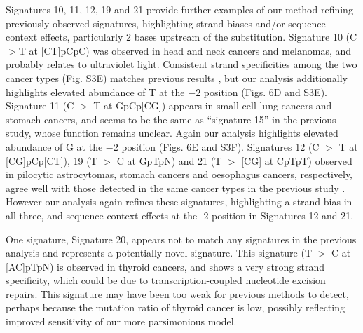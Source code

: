 \documentclass[10pt,letterpaper]{article}
\begin{document}
Signatures 10, 11, 12, 19 and 21 provide further examples
of our method refining previously observed signatures, highlighting strand biases and/or sequence context effects,
particularly 2 bases upstream of the substitution.
Signature 10 (C $>$T at [CT]pCpC) was observed in head and neck cancers and melanomas, and probably relates to ultraviolet light.
Consistent strand specificities among the two cancer types (Fig. S3E) matches previous results \cite{pmid23318258}, 
but our analysis additionally highlights elevated abundance of T at the $-2$ position (Figs. 6D and S3E). 
Signature 11 (C $>$ T at GpCp[CG]) appears in small-cell lung cancers and stomach cancers,
and seems to be the same as ``signature 15'' in the previous study, whose function remains unclear. Again our analysis highlights elevated abundance of G at the $-2$ position (Figs. 6E and S3F).
Signatures 12 (C $>$ T at [CG]pCp[CT]), 19 (T $>$ C at GpTpN) and 21 (T $>$ [CG] at CpTpT) observed in pilocytic astrocytomas, stomach cancers and oesophagus cancers, respectively, agree well with those detected in the same cancer types in the previous study \cite{pmid23318258}. However our analysis again refines these signatures,
highlighting a strand bias in all three, and sequence context effects at the -2 position in Signatures 12 and 21.


One signature, Signature 20, appears not to match any signatures in the previous analysis \cite{pmid23318258} and represents a potentially novel signature. 
This signature (T $>$ C at [AC]pTpN) is observed in thyroid cancers, and shows a very strong strand specificity, which could be due to transcription-coupled nucleotide excision repairs.
This signature may have been too weak for previous
methods to detect, perhaps because the mutation ratio of thyroid cancer is low, possibly reflecting improved sensitivity of our more parsimonious model.
\end{document}
